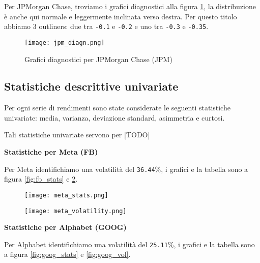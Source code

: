 Per JPMorgan Chase, troviamo i grafici diagnostici alla figura \ref{fig:jpm_diagn}, la distribuzione è anche qui normale e leggermente inclinata verso destra.
Per questo titolo abbiamo 3 outliners: due tra \verb|-0.1| e \verb|-0.2| e uno tra \verb|-0.3| e \verb|-0.35|.

\vspace{3cm}

\begin{figure}[h]
  \centering
  \texttt{[image: jpm\_diagn.png]}
  \caption{Grafici diagnostici per JPMorgan Chase (JPM)}
  \label{fig:jpm_diagn}
\end{figure}

\pagebreak

\subsection{Statistiche descrittive univariate}

Per ogni serie di rendimenti sono state considerate le seguenti statistiche univariate: media, varianza, deviazione standard, asimmetria e curtosi.

Tali statistiche univariate servono per [TODO]

\textbf{Statistiche per Meta (FB)}

Per Meta identifichiamo una volatilità del \verb|36.44|\%, i grafici e la tabella sono a figura \ref{fig:fb_stats} e \ref{fig:fb_vol}.

\begin{figure}[h]
  \centering
  \begin{minipage}{.5\textwidth}
    \centering
    \vspace{4.35cm}
    \texttt{[image: meta\_stats.png]}
    \label{fig:fb_stats}
  \end{minipage}%
  \begin{minipage}{.5\textwidth}
    \centering
    \texttt{[image: meta\_volatility.png]}
    \label{fig:fb_vol}
  \end{minipage}
\end{figure}

\textbf{Statistiche per Alphabet (GOOG)}

Per Alphabet identifichiamo una volatilità del \verb|25.11|\%, i grafici e la tabella sono a figura \ref{fig:goog_stats} e \ref{fig:goog_vol}.

